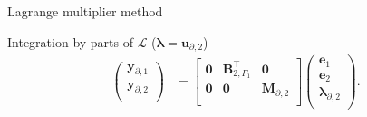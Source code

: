 \documentclass[aspectratio=169]{ISAE-Beamer}
\begin{document}
\begin{frame}{Lagrange multiplier method}
{\begin{block}{Integration by parts of $\mathcal{L}$ ($\bm{\lambda} = \bm{u}_{\partial, 2}$)}
\begin{equation*}
\begin{aligned}
\begin{pmatrix}
	\mathbf{y}_{\partial, 1} \\
	\mathbf{y}_{\partial, 2} \\
	\end{pmatrix}
	&= \begin{bmatrix}
	\mathbf{0} & \mathbf{B}_{2, \Gamma_1}^\top & \mathbf{0} \\
	\mathbf{0} & \mathbf{0} & \mathbf{M}_{\partial, 2} \\
	\end{bmatrix}\begin{pmatrix}
	\mathbf{e}_{1} \\
	\mathbf{e}_{2} \\
	{\bm{\lambda}}_{\partial, 2} \\
	\end{pmatrix}.
	\end{aligned}
	\end{equation*}
\end{block}
}

\end{frame}
\end{document}
